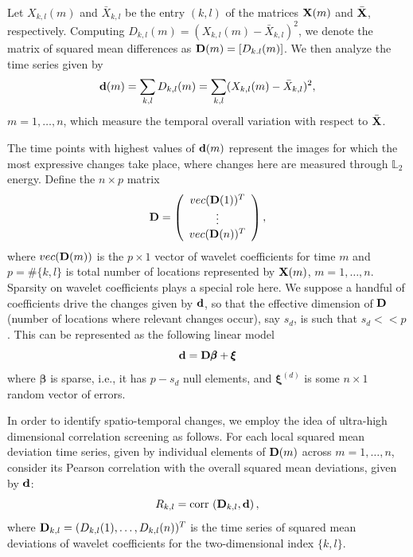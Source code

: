 \documentclass[journal]{IEEEtran}
\def\corr{\mbox{{\rm corr\,}}}
\newcommand{\vbeta}{\pmb{\beta}}
\newcommand{\vxi}{\pmb{\xi}}
\newcommand{\vD}{{\textbf D}}
\newcommand{\vd}{{\textbf d}}
\newcommand{\vX}{{\textbf X}}
\begin{document}
Let $X_{k,l}(m)$ and $\bar{X}_{k,l}$ be the entry $(k,l)$ of the matrices $\vX(m)$ and $\bar{\vX}$, respectively. Computing $D_{k,l}(m)=(X_{k,l}(m)-\bar{X}_{k,l})^2$, we denote the matrix of squared mean differences as $\vD(m) = [D_{k.l}(m)]$. We then 
analyze the time series given by
\begin{equation} 
\vd(m)= \sum_{k,l}D_{k,l}(m) = \sum_{k,l}(X_{k,l}(m) - \bar{X}_{k,l})^2,
\label{E:eq_defdm}
\end{equation}
$m=1,\ldots,n$, which measure the temporal overall variation with respect to $\bar{\vX}$.

The time points with highest values of $\vd(m)$ represent the images for which the most expressive changes take place, where changes here are measured through $\mathbb{L}_2$ energy. Define the  $n\times p$ matrix
\begin{equation*}
 \vD=\left(
 \begin{array}{c}
 vec(\vD(1))^T\\
 \vdots\\
 vec(\vD(n))^T\\
 \end{array}
 \right),
\label{eq_defmatrixD}
\end{equation*}
where $vec(\vD(m))$ is the $p\times 1$ vector of wavelet coefficients for time $m$ and $p=\#\{k,l\}$ is total number of locations represented by $\vX(m)$, $m=1,\ldots,n$. Sparsity \cite{johnstone2009statistical} on wavelet coefficients plays a special role here.  We suppose a handful of coefficients drive the changes given by $\vd$, so that the effective dimension of $\vD$ (number of locations where relevant changes occur), say $s_d$, is such that $s_d<<p$. This can be represented as the following linear model
\begin{equation} 
\vd=\vD\vbeta+\vxi
\label{E:sparsemodel_d}
\end{equation}
where $\vbeta$ is sparse, i.e., it has $p-s_d$ null elements, and $\vxi^{(d)}$ is some $n\times 1$ random vector of errors.

In order to identify spatio-temporal changes, we employ the idea of ultra-high dimensional correlation screening \cite{fan2020statistical} as follows. For each local squared mean deviation time series, given by individual elements of $\vD(m)$ across $m=1,\ldots,n$, consider its Pearson correlation with the overall squared mean deviations, given by $\vd$:
\begin{equation*}
R_{k,l}= \corr\left( \vD_{k,l}, \vd\right),
\label{def_Rkld}
\end{equation*}
where $\vD_{k,l}=(D_{k,l}(1),\ldots,D_{k,l}(n))^T$ is the time series of squared mean deviations of wavelet coefficients for the two-dimensional index $\{k,l\}$.
\end{document}
